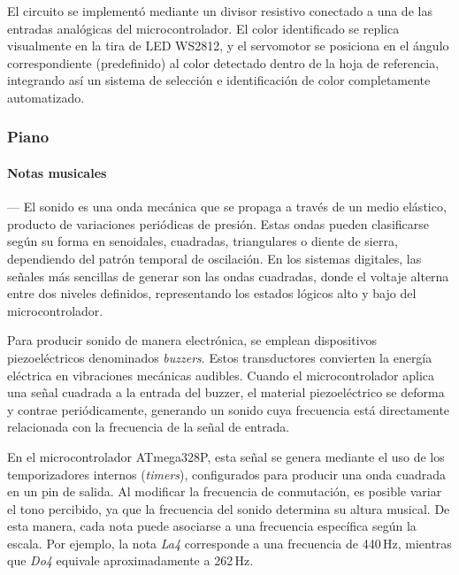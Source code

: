     \vspace{1em}

    El circuito se implementó mediante un divisor resistivo conectado a una de las entradas analógicas del microcontrolador. El color identificado se replica visualmente en la tira de LED WS2812, y el servomotor se posiciona en el ángulo correspondiente (predefinido) al color detectado dentro de la hoja de referencia, integrando así un sistema de selección e identificación de color completamente automatizado.

    \vspace{1em}

\subsubsection{\textbf{Piano}}
    \paragraph*{\textbf{Notas musicales}}---
    El sonido es una onda mecánica que se propaga a través de un medio elástico, producto de variaciones periódicas de presión. Estas ondas pueden clasificarse según su forma en senoidales, cuadradas, triangulares o diente de sierra, dependiendo del patrón temporal de oscilación. En los sistemas digitales, las señales más sencillas de generar son las ondas cuadradas, donde el voltaje alterna entre dos niveles definidos, representando los estados lógicos alto y bajo del microcontrolador.

    \vspace{1em}

    Para producir sonido de manera electrónica, se emplean dispositivos piezoeléctricos denominados \textit{buzzers}. Estos transductores convierten la energía eléctrica en vibraciones mecánicas audibles. Cuando el microcontrolador aplica una señal cuadrada a la entrada del buzzer, el material piezoeléctrico se deforma y contrae periódicamente, generando un sonido cuya frecuencia está directamente relacionada con la frecuencia de la señal de entrada.

    \vspace{1em}

    En el microcontrolador ATmega328P, esta señal se genera mediante el uso de los temporizadores internos (\textit{timers}), configurados para producir una onda cuadrada en un pin de salida. Al modificar la frecuencia de conmutación, es posible variar el tono percibido, ya que la frecuencia del sonido determina su altura musical. De esta manera, cada nota puede asociarse a una frecuencia específica según la escala. Por ejemplo, la nota \textit{La4} corresponde a una frecuencia de 440\,Hz, mientras que \textit{Do4} equivale aproximadamente a 262\,Hz.

